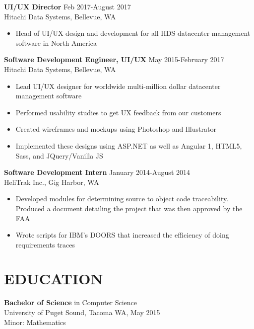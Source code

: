 \documentclass[margin]{res}
\begin{document}
\begin{resume}
 {\bf UI/UX Director} \hfill Feb 2017-August 2017 \\ 
                Hitachi Data Systems, Bellevue, WA 
                 \begin{itemize}  \itemsep -2pt %
                 \item Head of UI/UX design and development for all HDS datacenter management software in North America
                 \end{itemize}

 {\bf Software Development Engineer, UI/UX} \hfill May 2015-February 2017 \\ 
                Hitachi Data Systems, Bellevue, WA 
                 \begin{itemize}  \itemsep -2pt %
                 \item   Lead UI/UX designer for worldwide multi-million dollar datacenter management software
                 \item Performed usability studies to get UX feedback from our customers
                \item   Created wireframes and mockups using Photoshop and Illustrator
                \item Implemented these designs using ASP.NET as well as Angular 1, HTML5, Sass, and JQuery/Vanilla JS
                \end{itemize}
                 {\bf Software Development Intern} \hfill January 2014-August 2014 \\ 
                HeliTrak Inc., Gig Harbor, WA
                \begin{itemize}  \itemsep -2pt %
                 \item Developed modules for determining source to object code traceability. Produced a document detailing the project that was then approved by the FAA
                 \item Wrote scripts for IBM’s DOORS that increased the efficiency of doing requirements traces
                \end{itemize}             
                
\section{EDUCATION} {\bf Bachelor of Science} in Computer Science \\
                University of Puget Sound, Tacoma WA, 
                May 2015 \\
                Minor: Mathematics \\
					

\end{resume}
\end{document}
